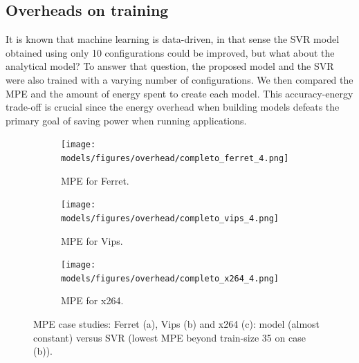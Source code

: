 \subsection{Overheads on training} \label{sec:overhead}
It is known that machine learning is data-driven, in that sense the SVR model obtained using only 10 configurations could be improved, but what about the analytical model? 
To answer that question, the proposed model and the SVR were also trained with a varying  number of configurations.
We then compared the MPE and the amount of energy spent to create each model. 
This accuracy-energy trade-off is crucial since the energy overhead when building models defeats the primary goal of saving power when running applications.


\begin{figure}[H]
	\centering
	\begin{subfigure}[b]{0.45\textwidth}
		\centerline{\texttt{[image: models/figures/overhead/completo\_ferret\_4.png]}}
		\caption{MPE for Ferret.}
		\label{fig:overhead_ferret}
	\end{subfigure}
	\begin{subfigure}[b]{0.45\textwidth}
		\centerline{\texttt{[image: models/figures/overhead/completo\_vips\_4.png]}}
		\caption{MPE for Vips.}
		\label{fig:overhead_vips}
	\end{subfigure}
	\begin{subfigure}[b]{0.45\textwidth}
		\centerline{\texttt{[image: models/figures/overhead/completo\_x264\_4.png]}}
		\caption{MPE for x264.}
		\label{fig:overhead_x264}
	\end{subfigure}
	\caption{MPE case studies: Ferret (a), Vips (b) and x264 (c): model (almost constant) versus SVR (lowest MPE beyond train-size 35 on case (b)).}
	\label{fig:overheadFerretVips}
\end{figure}


